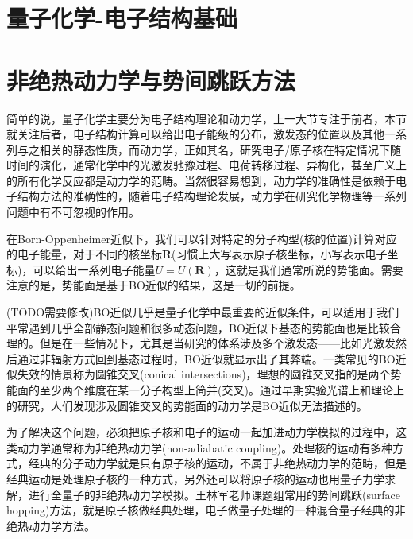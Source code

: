 \documentclass{article}
\numberwithin{equation}{section}
\begin{document}
  \section{量子化学-电子结构基础}

    \section{非绝热动力学与势间跳跃方法}
    简单的说，量子化学主要分为电子结构理论和动力学，上一大节专注于前者，本节就关注后者，电子结构计算可以给出电子能级的分布，激发态的位置以及其他一系列与之相关的静态性质，而动力学，正如其名，研究电子/原子核在特定情况下随时间的演化，通常化学中的光激发驰豫过程、电荷转移过程、异构化，甚至广义上的所有化学反应都是动力学的范畴。当然很容易想到，动力学的准确性是依赖于电子结构方法的准确性的，随着电子结构理论发展，动力学在研究化学物理等一系列问题中有不可忽视的作用。

    在Born-Oppenheimer近似下，我们可以针对特定的分子构型(核的位置)计算对应的电子能量，对于不同的核坐标$\mathbf{R}$(习惯上大写表示原子核坐标，小写表示电子坐标)，可以给出一系列电子能量$U=U(\mathbf{R})$，这就是我们通常所说的势能面。需要注意的是，势能面是基于BO近似的结果，这是一切的前提。
    
    (TODO需要修改)BO近似几乎是量子化学中最重要的近似条件，可以适用于我们平常遇到几乎全部静态问题和很多动态问题，BO近似下基态的势能面也是比较合理的。但是在一些情况下，尤其是当研究的体系涉及多个激发态——比如光激发然后通过非辐射方式回到基态过程时，BO近似就显示出了其弊端。一类常见的BO近似失效的情景称为圆锥交叉(conical intersections)，理想的圆锥交叉指的是两个势能面的至少两个维度在某一分子构型上简并(交叉)。通过早期实验光谱上和理论上的研究，人们发现涉及圆锥交叉的势能面的动力学是BO近似无法描述的。
    
    为了解决这个问题，必须把原子核和电子的运动一起加进动力学模拟的过程中，这类动力学通常称为非绝热动力学(non-adiabatic coupling)。处理核的运动有多种方式，经典的分子动力学就是只有原子核的运动，不属于非绝热动力学的范畴，但是经典运动是处理原子核的一种方式，另外还可以将原子核的运动也用量子力学求解，进行全量子的非绝热动力学模拟。王林军老师课题组常用的势间跳跃(surface hopping)方法，就是原子核做经典处理，电子做量子处理的一种混合量子经典的非绝热动力学方法。
\end{document}
